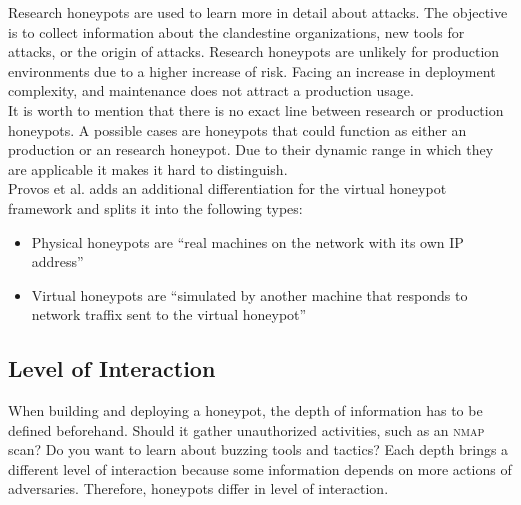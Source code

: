 Research honeypots are used to learn more in detail about attacks. The objective is to collect information about the clandestine organizations, new tools for attacks, or the origin of attacks. Research honeypots are unlikely for production environments due to a higher increase of risk. Facing an increase in deployment complexity, and maintenance does not attract a production usage.\cite{Spitzner2003}\\

It is worth to mention that there is no exact line between research or production honeypots. A possible cases are honeypots that could function as either an production or an research honeypot. Due to their dynamic range in which they are applicable it makes it hard to distinguish.\\

Provos et al. adds an additional differentiation for the virtual honeypot framework \cite{Provos2003} and splits it into the following types:

\begin{itemize}
    \item Physical honeypots are \enquote{real machines on the network with its own IP address} \cite{Provos2003}
    \item Virtual honeypots are \enquote{simulated by another machine that responds to network traffix sent to the virtual honeypot} \cite{Provos2003}
\end{itemize}

\subsection{Level of Interaction}
\label{subsec:interaction-honeypots}

When building and deploying a honeypot, the depth of information has to be defined beforehand. Should it gather unauthorized activities, such as an \textsc{nmap} scan? Do you want to learn about buzzing tools and tactics? Each depth brings a different level of interaction because some information depends on more actions of adversaries. Therefore, honeypots differ in level of interaction.\\

